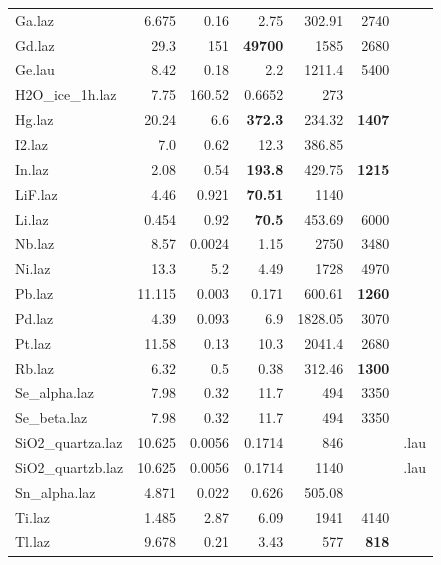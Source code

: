 \begin{table}
\begin{center}
{\begin{small}
\begin{tabular}{|l|rrr|rr|p{}|}
Ga.laz             & 6.675     & 0.16     &2.75      &302.91    &2740&\\
Gd.laz             & 29.3      & 151      &\textbf{49700}     &1585      &2680&\\
Ge.lau             & 8.42      & 0.18     &2.2       &1211.4    &5400  & \\
H2O\_ice\_1h.laz     & 7.75      & 160.52   &0.6652    &273       &     &\\
Hg.laz             & 20.24     & 6.6      &\textbf{372.3}     &234.32    &\textbf{1407}&\\
I2.laz             & 7.0       & 0.62     &12.3      &386.85    &   &\\
In.laz             & 2.08      & 0.54     &\textbf{193.8}     &429.75    &\textbf{1215}&\\
LiF.laz            & 4.46      & 0.921    &\textbf{70.51}     &1140      &   &\\
Li.laz             & 0.454     & 0.92     &\textbf{70.5}      &453.69    &6000&\\
Nb.laz             & 8.57      & 0.0024   &1.15      &2750      &3480&\\
Ni.laz             & 13.3      & 5.2      &4.49      &1728      &4970&\\
Pb.laz             & 11.115    & 0.003    &0.171     &600.61    &\textbf{1260}&\\
Pd.laz             & 4.39      & 0.093    &6.9       &1828.05   &3070&\\
Pt.laz             & 11.58     & 0.13     &10.3      &2041.4    &2680&\\
Rb.laz             & 6.32      & 0.5      &0.38      &312.46    &\textbf{1300}  & \\
Se\_alpha.laz       & 7.98      & 0.32     &11.7      &494       &3350&\\
Se\_beta.laz        & 7.98      & 0.32     &11.7      &494       &3350&\\
SiO2\_quartza.laz   & 10.625    & 0.0056   &0.1714    &846       &      & .lau\\
SiO2\_quartzb.laz   & 10.625    & 0.0056   &0.1714    &1140      &      & .lau\\
Sn\_alpha.laz       & 4.871     & 0.022    &0.626     &505.08    &     &\\
Ti.laz             & 1.485     & 2.87     &6.09      &1941      &4140&\\
Tl.laz             & 9.678     & 0.21     &3.43      &577       &\textbf{818}&\\

\end{tabular}
\end{small}}
\end{center}
\end{table}
